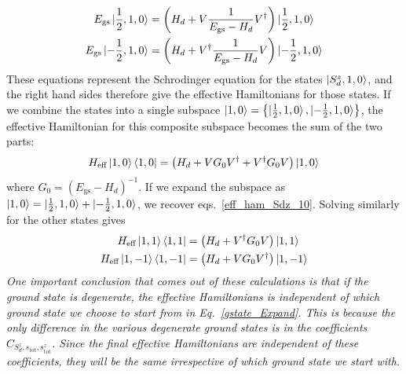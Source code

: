 \documentclass[12pt]{revtex4-2}
\begin{document}
\begin{align}
	\label{eff_ham_Sdz_10}
	E_\text{gs} \ket{\frac{1}{2}, 1, 0} &= \left(H_d + V \frac{1}{E_\text{gs} - H_d}V^\dagger\right) \ket{\frac{1}{2}, 1, 0}\\
	E_\text{gs} \ket{-\frac{1}{2}, 1, 0} &= \left(H_d + V^\dagger \frac{1}{E_\text{gs} - H_d} V\right) \ket{-\frac{1}{2}, 1, 0}\\
\end{align}
These equations represent the Schrodinger equation for the states \(\ket{S_d^z, 1, 0}\), and the right hand sides therefore give the effective Hamiltonians for those states. If we combine the states into a single subspace \(\ket{1,0}= \left\{\ket{\frac{1}{2}, 1, 0}, \ket{-\frac{1}{2}, 1, 0}\right\}\), the effective Hamiltonian for this composite subspace becomes the sum of the two parts:
\begin{align}
	\label{eff_ham_10}
	H_\text{eff}\ket{1, 0}\bra{1, 0} = \left(H_d + V G_0 V^\dagger + V^\dagger G_0  V\right) \ket{1, 0}
\end{align}
where \(G_0 = \left(E_\text{gs} - H_d\right)^{-1}\). If we expand the subspace as \(\ket{1,0} = \ket{\frac{1}{2}, 1, 0} + \ket{-\frac{1}{2}, 1, 0}\), we recover eqs.~\ref{eff_ham_Sdz_10}. Solving similarly for the other states gives
\begin{align}
	H_\text{eff}\ket{1,  1}\bra{1,  1} &= \left(H_d + V^\dagger G_0  V\right) \ket{1,  1}\\
	H_\text{eff}\ket{1, - 1}\bra{1, - 1} &= \left(H_d + V G_0 V^\dagger\right) \ket{1, - 1}
\end{align}
\textit{One important conclusion that comes out of these calculations is that if the ground state is degenerate, the effective Hamiltonians is independent of which ground state we choose to start from in Eq.~\ref{gstate_Expand}. This is because the only difference in the various degenerate ground states is in the coefficients \(C_{S_d^z, s_\text{tot},s_\text{tot}^z}\). Since the final effective Hamiltonians are independent of these coefficients, they will be the same irrespective of which ground state we start with.}
\end{document}
